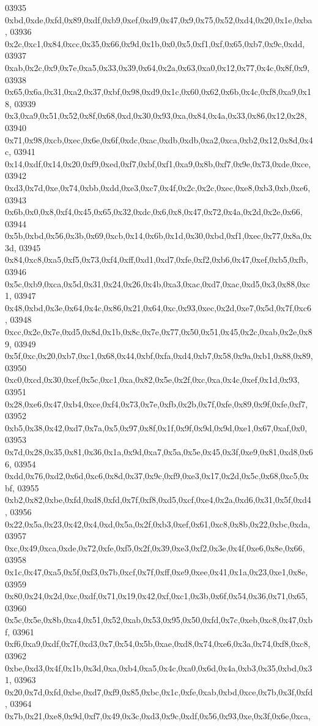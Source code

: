 \begin{DoxyCode}
03935   0xbd,0xde,0xfd,0x89,0xdf,0xb9,0xef,0xd9,0x47,0x9,0x75,0x52,0xd4,0x20,0x1e,0xba,
03936   0x2c,0xc1,0x84,0xcc,0x35,0x66,0x9d,0x1b,0x0,0x5,0xf1,0xf,0x65,0xb7,0x9c,0xdd,
03937   0xab,0x2c,0x9,0x7e,0xa5,0x33,0x39,0x64,0x2a,0x63,0xa0,0x12,0x77,0x4c,0x8f,0x9,
03938   0x65,0x6a,0x31,0xa2,0x37,0xbf,0x98,0xd9,0x1c,0x60,0x62,0x6b,0x4c,0xf8,0xa9,0x18,
03939   0x3,0xa9,0x51,0x52,0x8f,0x68,0xd,0x30,0x93,0xa,0x84,0x4a,0x33,0x86,0x12,0x28,
03940   0x71,0x98,0xcb,0xec,0x6e,0x6f,0xdc,0xac,0xdb,0xdb,0xa2,0xca,0xb2,0x12,0x8d,0x4c,
03941   0x14,0xdf,0x14,0x20,0xf9,0xed,0xf7,0xbf,0xf1,0xa9,0x8b,0xf7,0x9e,0x73,0xde,0xce,
03942   0xd3,0x7d,0xe,0x74,0xbb,0xdd,0xe3,0xc7,0x4f,0x2c,0x2c,0xec,0xe8,0xb3,0xb,0xe6,
03943   0x6b,0x0,0x8,0xf4,0x45,0x65,0x32,0xdc,0x6,0x8,0x47,0x72,0x4a,0x2d,0x2e,0x66,
03944   0x5b,0xbd,0x56,0x3b,0x69,0xcb,0x14,0x6b,0x1d,0x30,0xbd,0xf1,0xec,0x77,0x8a,0x3d,
03945   0x84,0xc8,0xa5,0xf5,0x73,0xf4,0xff,0xd1,0xd7,0xfe,0xf2,0xb6,0x47,0xef,0xb5,0xfb,
03946   0x5c,0xb9,0xca,0x5d,0x31,0x24,0x26,0x4b,0xa3,0xac,0xd7,0xac,0xd5,0x3,0x88,0xc1,
03947   0x48,0xbd,0x3e,0x64,0x4c,0x86,0x21,0x64,0xc,0x93,0xec,0x2d,0xe7,0x5d,0x7f,0xc6,
03948   0xcc,0x2e,0x7e,0xd5,0x8d,0x1b,0x8c,0x7e,0x77,0x50,0x51,0x45,0x2c,0xab,0x2e,0x89,
03949   0x5f,0xc,0x20,0xb7,0xc1,0x68,0x44,0xbf,0xfa,0xd4,0xb7,0x58,0x9a,0xb1,0x88,0x89,
03950   0xc0,0xcd,0x30,0xef,0x5c,0xc1,0xa,0x82,0x5e,0x2f,0xc,0xa,0x4c,0xef,0x1d,0x93,
03951   0x28,0xe6,0x47,0xb4,0xce,0xf4,0x73,0x7e,0xfb,0x2b,0x7f,0xfe,0x89,0x9f,0xfe,0xf7,
03952   0xb5,0x38,0x42,0xd7,0x7a,0x5,0x97,0x8f,0x1f,0x9f,0x9d,0x9d,0xe1,0x67,0xaf,0x0,
03953   0x7d,0x28,0x35,0x81,0x36,0x1a,0x9d,0xa7,0x5a,0x5e,0x45,0x3f,0xe9,0x81,0xd8,0x66,
03954   0xdd,0x76,0xd2,0x6d,0xc6,0x8d,0x37,0x9c,0xf9,0xe3,0x17,0x2d,0x5c,0x68,0xc5,0xbf,
03955   0xb2,0x82,0xbe,0xfd,0xd8,0xfd,0x7f,0xf8,0xd5,0xcf,0xe4,0x2a,0xd6,0x31,0x5f,0xd4,
03956   0x22,0x5a,0x23,0x42,0x4,0xd,0x5a,0x2f,0xb3,0xef,0x61,0xc8,0x8b,0x22,0xbc,0xda,
03957   0xc,0x49,0xca,0xde,0x72,0xfe,0xf5,0x2f,0x39,0xe3,0xf2,0x3e,0x4f,0xe6,0x8e,0x66,
03958   0x1c,0x47,0xa5,0x5f,0xf3,0x7b,0xcf,0x7f,0xff,0xe9,0xee,0x41,0x1a,0x23,0xe1,0x8e,
03959   0x80,0x24,0x2d,0xc,0xdf,0x71,0x19,0x42,0xf,0xc1,0x3b,0x6f,0x54,0x36,0x71,0x65,
03960   0x5c,0x5e,0x8b,0xa4,0x51,0x52,0xab,0x53,0x95,0x50,0xfd,0x7c,0xeb,0xc8,0x47,0xbf,
03961   0xf6,0xa9,0xdf,0x7f,0xd3,0x7,0x54,0x5b,0xae,0xd8,0x74,0xe6,0x3a,0x74,0xf8,0xc8,
03962   0xbe,0xd3,0x4f,0x1b,0x3d,0xa,0xb4,0xa5,0x4c,0xa0,0x6d,0x4a,0xb3,0x35,0xbd,0x31,
03963   0x20,0x7d,0xfd,0xbe,0xd7,0xf9,0x85,0xbc,0x1c,0xfe,0xab,0xbd,0xce,0x7b,0x3f,0xfd,
03964   0x7b,0x21,0xe8,0x9d,0xf7,0x49,0x3c,0xd3,0x9c,0xdf,0x56,0x93,0xe,0x3f,0x6e,0xca,

\end{DoxyCode}

